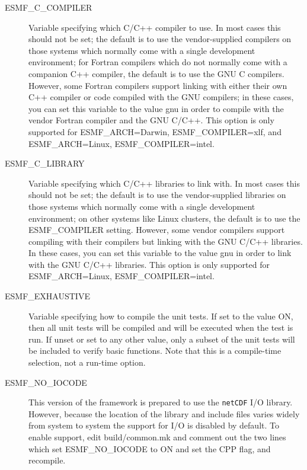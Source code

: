 \begin{description}
\item[ESMF\_C\_COMPILER]

Variable specifying which C/C++ compiler to use.   In most cases
this should not be set; the default is to use the vendor-supplied
compilers on those systems which normally come with a single
development environment; for Fortran compilers which do not normally
come with a companion C++ compiler, the default is to use the GNU C compilers.
However, some Fortran compilers support linking with either their
own C++ compiler or code compiled with the GNU compilers; 
in these cases, you can set this variable
to the value gnu in order to compile with the vendor Fortran
compiler and the GNU C/C++.   This option is only supported for
ESMF\_ARCH=Darwin, ESMF\_COMPILER=xlf, and ESMF\_ARCH=Linux,
ESMF\_COMPILER=intel.

\item[ESMF\_C\_LIBRARY]

Variable specifying which C/C++ libraries to link with.  In most cases
this should not be set; the default is to use the vendor-supplied
libraries on those systems which normally come with a single
development environment; on other systems like Linux clusters,
the default is to use the ESMF\_COMPILER setting.  However, some
vendor compilers support compiling with their compilers but linking
with the GNU C/C++ libraries.
In these cases, you can set this variable
to the value gnu in order to link with the GNU C/C++ libraries.
This option is only supported for ESMF\_ARCH=Linux, ESMF\_COMPILER=intel.

\item[ESMF\_EXHAUSTIVE] 

Variable specifying how to compile the unit tests.
If set to the value ON, then all unit tests will be compiled
and will be executed when the test is run.  If unset or set 
to any other value, only a subset of the unit tests will 
be included to verify basic functions.  Note that this
is a compile-time selection, not a run-time option.

\item[ESMF\_NO\_IOCODE] 

This version of the framework is prepared to use the {\tt netCDF} I/O
library.  However, because the location of the library and include files
varies widely from system to system the support for I/O is disabled by
default.  To enable support, edit build/common.mk and comment out the two
lines which set ESMF\_NO\_IOCODE to ON and set the CPP flag, and recompile.


\end{description}

